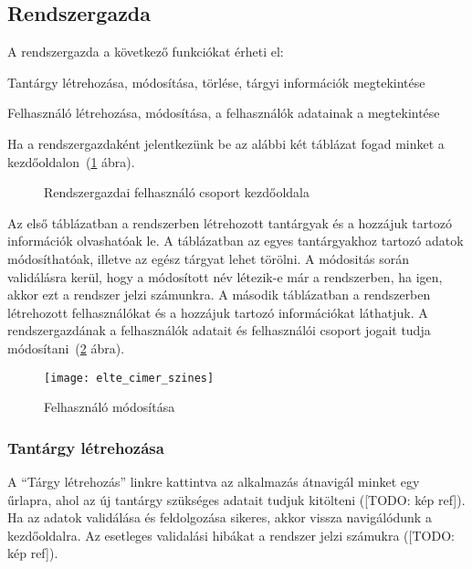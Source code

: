 \subsection{Rendszergazda}\label{step:admin-role}
A rendszergazda a következő funkciókat érheti el:
\begin{compactitem}
    \item Tantárgy létrehozása, módosítása, törlése, tárgyi információk megtekintése
    \item Felhasználó létrehozása, módosítása, a felhasználók adatainak a megtekintése
\end{compactitem}
Ha a rendszergazdaként jelentkezünk be az alábbi két táblázat fogad minket a kezdőoldalon~(\ref{fig:admin-page} ábra). 
\begin{figure}[H]
	\centering
	\hspace{5pt}
	\caption{Rendszergazdai felhasználó csoport kezdőoldala}
	\label{fig:admin-page}
\end{figure}
Az első táblázatban a rendszerben létrehozott tantárgyak és a hozzájuk tartozó információk olvashatóak le. A táblázatban az egyes tantárgyakhoz tartozó adatok módosíthatóak, illetve az egész tárgyat lehet törölni. A módositás során validálásra kerül, hogy a módosított név létezik-e már a rendszerben, ha igen, akkor ezt a rendszer jelzi számunkra. A második táblázatban a rendszerben létrehozott felhasználókat és a hozzájuk tartozó információkat láthatjuk. A rendszergazdának a felhasználók adatait és felhasználói csoport jogait tudja módosítani~(\ref{fig:admin-user-edit} ábra).
\begin{figure}[H]
	\centering
	\texttt{[image: elte\_cimer\_szines]}
	\caption{Felhasználó módosítása}
	\label{fig:admin-user-edit}
\end{figure}
\subsubsection{Tantárgy létrehozása}
A ``Tárgy létrehozás'' linkre kattintva az alkalmazás átnavigál minket egy űrlapra, ahol az új tantárgy szükséges adatait tudjuk kitölteni ([TODO: kép ref]). Ha az adatok validálása és feldolgozása sikeres, akkor vissza navigálódunk a kezdőoldalra. Az esetleges validalási hibákat a rendszer jelzi számukra ([TODO: kép ref]).
